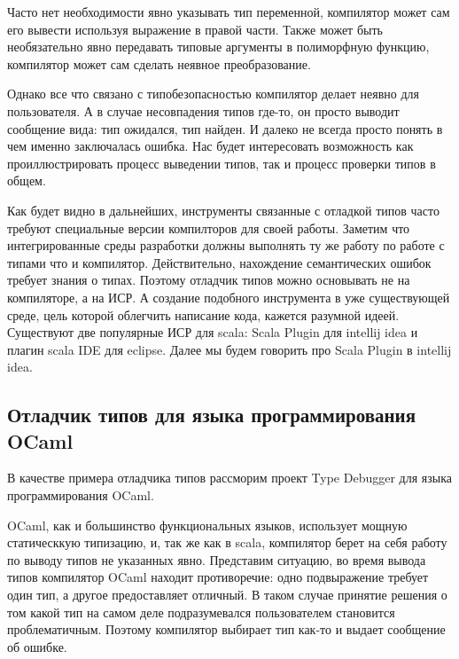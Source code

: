 Часто нет необходимости явно указывать тип переменной, компилятор может
сам его вывести используя выражение в правой части.
Также может быть необязательно явно передавать типовые аргументы в полиморфную
функцию, компилятор может сам сделать неявное преобразование.

Однако все что связано с типобезопасностью компилятор делает неявно для пользователя.
А в случае несовпадения типов где-то, он просто выводит сообщение вида:
тип ожидался, тип найден.
И далеко не всегда просто понять в чем именно заключалась ошибка.
Нас будет интересовать возможность как проиллюстрировать процесс выведении типов,
так и процесс проверки типов в общем.



Как будет видно в дальнейших, инструменты связанные с отладкой типов часто
требуют специальные версии компилторов для своей работы.
Заметим что интегрированные среды разработки должны выполнять ту же работу по
работе с типами что и компилятор.
Действительно, нахождение семантических ошибок требует знания о типах.
Поэтому отладчик типов можно основывать не на компиляторе, а на ИСР.
А создание подобного инструмента в уже существующей среде, цель которой
облегчить написание кода, кажется разумной идеей.
Существуют две популярные ИСР для scala: Scala Plugin для intellij idea и
плагин scala IDE для eclipse.
Далее мы будем говорить про Scala Plugin в intellij idea.

\subsection{Отладчик типов для языка программирования OCaml}
\label{sec:ocaml}
В качестве примера отладчика типов рассморим проект Type Debugger для
языка программирования OCaml.

OCaml, как и большинство функциональных языков, использует мощную статическкую
типизацию, и, так же как в scala, компилятор берет на себя работу по выводу типов
не указанных явно.
Представим ситуацию, во время вывода типов компилятор OCaml находит противоречие:
одно подвыражение требует один тип, а другое предоставляет отличный.
В таком случае принятие решения о том какой тип на самом деле подразумевался
пользователем становится проблематичным.
Поэтому компилятор выбирает тип как-то и выдает сообщение об ошибке.

